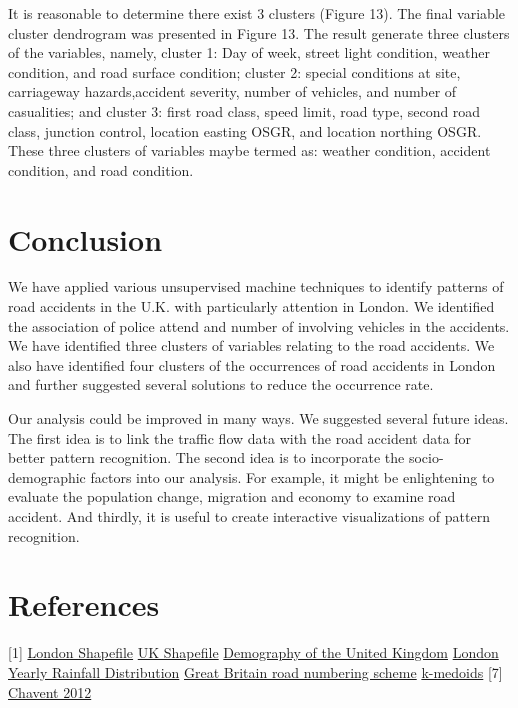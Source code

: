 \documentclass{neu_handout}
\begin{document}
It is reasonable to determine there exist 3 clusters (Figure 13). The final variable cluster dendrogram was presented in Figure 13. The result generate three clusters of the variables, namely, cluster 1: Day of week, street light condition, weather condition, and road surface condition; cluster 2: special conditions at site, carriageway hazards,accident severity, number of vehicles, and number of casualities; and cluster 3: first road class, speed limit, road type, second road class, junction control, location easting OSGR, and location northing OSGR. These three clusters of variables maybe termed as: weather condition, accident condition, and road condition.

\section{Conclusion}

We have applied various unsupervised machine techniques to identify patterns of road accidents in the U.K. with particularly attention in London. We identified the association of police attend and number of involving vehicles in the accidents. We have identified three clusters of variables relating to the road accidents. We also have identified four clusters of the occurrences of road accidents in London and further suggested several solutions to reduce the occurrence rate. 

Our analysis could be improved in many ways. We suggested several future ideas. The first idea is to link the traffic flow data with the road accident data for better pattern recognition. The second idea is to incorporate the socio-demographic factors into our analysis. For example, it might be enlightening to evaluate the population change, migration and economy to examine road accident. And thirdly, it is useful to create interactive visualizations of pattern recognition.

\section{References}
 [1] \href{https://data.london.gov.uk/dataset/statistical-gis-boundary-files-london}{London Shapefile}
 \newline
 [2] \href{http://www.naturalearthdata.com} {UK Shapefile}
 \newline
 [3] \href{https://en.wikipedia.org/wiki/Demography_of_the_United_Kingdom}{Demography of the United Kingdom}
 \newline
 [4] \href{http://projectbritain.com/climate.html}{London Yearly Rainfall Distribution}
 \newline
 [5] \href{https://en.wikipedia.org/wiki/Great_Britain_road_numbering_scheme}{Great Britain road numbering scheme}
 \newline
 [6] \href{https://en.wikipedia.org/wiki/K-medoids}{k-medoids}
 [7] \href{Chavent M, Kuentz_Simonet V, Liquet B, Saracco J (2012) ClustOfVar: An R Package for the Clustering of Variables. Journal of Statistical Software 50(13)}{Chavent 2012}
\end{document}

